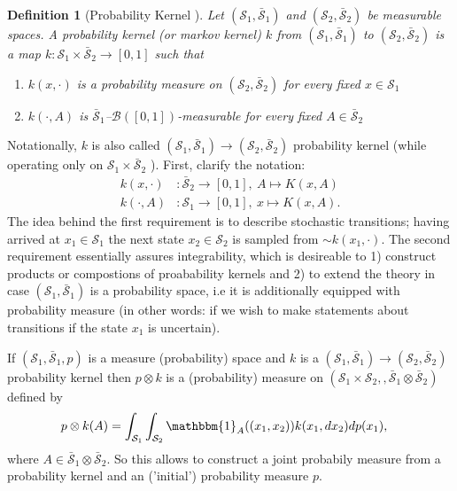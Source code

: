 \documentclass[10pt,a4paper]{article}
\newtheorem{definition}{Definition}
\begin{document}
	
\begin{definition}[Probability Kernel \cite{szepesvari2020bandit}]\label{def_probability_kernel}
	Let $(\mathcal S_1, \bar{\mathcal S}_1)$ and $(\mathcal S_2, \bar{\mathcal S}_2)$ be measurable spaces. A probability kernel (or markov kernel) $k$ from $(\mathcal S_1, \bar{\mathcal S}_1)$ to $(\mathcal S_2, \bar{\mathcal S}_2)$ is a map $k:  \mathcal S_1 \times \bar{\mathcal S}_2 \rightarrow [0,1]$ such that
	\begin{enumerate}
		\item $k(x, \cdot )$ is a probability measure on $(\mathcal S_2, \bar{\mathcal S}_2)$  for every fixed  $x \in \mathcal S_1$
		\item $k(\cdot, A )$ is  $\bar{\mathcal S}_1$--$\mathcal B([0,1])$-measurable for every fixed $A \in \bar{\mathcal S}_2$
	\end{enumerate}
\end{definition}	

\noindent
Notationally, $k$ is also called $(\mathcal S_1, \bar{\mathcal S}_1) \rightarrow (\mathcal S_2, \bar{\mathcal S}_2)$ probability kernel (while operating only on $ \mathcal S_1 \times  \bar{\mathcal S}_2$ ).  First, clarify the notation:
\begin{align*}
	k(x, \cdot )&: \bar{\mathcal S}_2 \rightarrow [0,1],~ A \mapsto K(x, A)\\
	k(\cdot, A )&:  \mathcal S_1 \rightarrow [0,1], ~ x  \mapsto K(x, A). 
\end{align*}
The idea behind the first requirement is to describe stochastic transitions; having arrived at $x_1 \in \mathcal S_1$ the next state $x_2 \in \mathcal S_2$ is sampled from $\sim k(x_1, \cdot)$. The second requirement essentially assures integrability, which is desireable to 1) construct products or compostions of proabability kernels and 2) to extend the theory in case $(\mathcal S_1, \bar{\mathcal S}_1)$ is a probability space, i.e it is additionally equipped with probability measure (in other words: if we wish to make statements about transitions if the state $x_1$ is uncertain).  

If $(\mathcal S_1, \bar{\mathcal S}_1, p)$ is a measure (probability) space and   $k$ is a $(\mathcal S_1, \bar{\mathcal S}_1) \rightarrow (\mathcal S_2, \bar{\mathcal S}_2)$ probability kernel   then $p\otimes k$ is a (probability) measure on $(\mathcal S_1 \times \mathcal S_2,, \bar{\mathcal S}_1 \otimes  \bar{\mathcal S}_2)$ defined by 
\begin{align}
	p\otimes k(A) &= \int _{\mathcal S_1}\int_{\mathcal S_2} \mathbbm{1}_A((x_1,x_2)) k (x_1, dx_2) dp(x_1) ,  
\end{align}
where $A \in \bar{\mathcal S}_1 \otimes  \bar{\mathcal S}_2$. So this allows to construct a joint probabily measure from a probability kernel and an ('initial') probability measure $p$.
\end{document}
